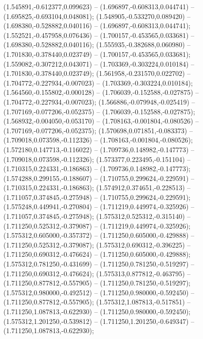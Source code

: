  (1.545891,-0.612377,0.099623) -- (1.696897,-0.608313,0.044741) -- (1.695825,-0.693104,0.048081);
 (1.548905,-0.533270,0.089420) -- (1.698380,-0.528882,0.040116) -- (1.696897,-0.608313,0.044741);
 (1.552521,-0.457958,0.076436) -- (1.700157,-0.453565,0.033681) -- (1.698380,-0.528882,0.040116);
 (1.555935,-0.382688,0.060980) -- (1.701830,-0.378440,0.023749) -- (1.700157,-0.453565,0.033681);
 (1.559082,-0.307212,0.043071) -- (1.703369,-0.303224,0.010184) -- (1.701830,-0.378440,0.023749);
 (1.561958,-0.231570,0.022702) -- (1.704772,-0.227934,-0.007023) -- (1.703369,-0.303224,0.010184);
 (1.564560,-0.155802,-0.000128) -- (1.706039,-0.152588,-0.027875) -- (1.704772,-0.227934,-0.007023);
 (1.566886,-0.079948,-0.025419) -- (1.707169,-0.077206,-0.052375) -- (1.706039,-0.152588,-0.027875);
 (1.568932,-0.004050,-0.053170) -- (1.708163,-0.001804,-0.080526) -- (1.707169,-0.077206,-0.052375);
 (1.570698,0.071851,-0.083373) -- (1.709018,0.073598,-0.112326) -- (1.708163,-0.001804,-0.080526);
 (1.572180,0.147713,-0.116022) -- (1.709736,0.148982,-0.147773) -- (1.709018,0.073598,-0.112326);
 (1.573377,0.223495,-0.151104) -- (1.710315,0.224331,-0.186863) -- (1.709736,0.148982,-0.147773);
 (1.574288,0.299155,-0.188607) -- (1.710755,0.299624,-0.229591) -- (1.710315,0.224331,-0.186863);
 (1.574912,0.374651,-0.228513) -- (1.711057,0.374845,-0.275948) -- (1.710755,0.299624,-0.229591);
 (1.575248,0.449941,-0.270804) -- (1.711219,0.449974,-0.325926) -- (1.711057,0.374845,-0.275948);
 (1.575312,0.525312,-0.315140) -- (1.711250,0.525312,-0.379087) -- (1.711219,0.449974,-0.325926);
 (1.575312,0.605000,-0.357372) -- (1.711250,0.605000,-0.429888) -- (1.711250,0.525312,-0.379087);
 (1.575312,0.690312,-0.396225) -- (1.711250,0.690312,-0.476624) -- (1.711250,0.605000,-0.429888);
 (1.575312,0.781250,-0.431699) -- (1.711250,0.781250,-0.519297) -- (1.711250,0.690312,-0.476624);
 (1.575313,0.877812,-0.463795) -- (1.711250,0.877812,-0.557905) -- (1.711250,0.781250,-0.519297);
 (1.575312,0.980000,-0.492512) -- (1.711250,0.980000,-0.592450) -- (1.711250,0.877812,-0.557905);
 (1.575312,1.087813,-0.517851) -- (1.711250,1.087813,-0.622930) -- (1.711250,0.980000,-0.592450);
 (1.575312,1.201250,-0.539812) -- (1.711250,1.201250,-0.649347) -- (1.711250,1.087813,-0.622930);
